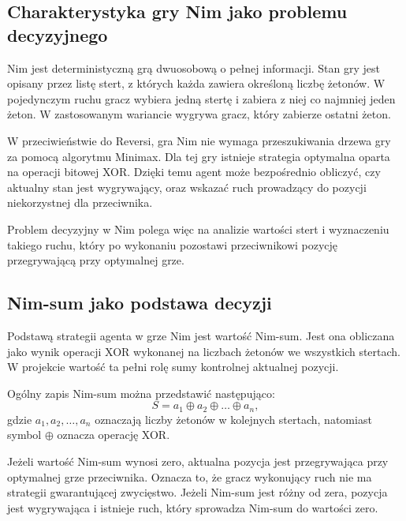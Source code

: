 \subsection{Charakterystyka gry Nim jako problemu decyzyjnego}

Nim jest deterministyczną grą dwuosobową o pełnej informacji. Stan gry jest opisany przez listę stert, z których każda zawiera określoną liczbę żetonów. W pojedynczym ruchu gracz wybiera jedną stertę i zabiera z niej co najmniej jeden żeton. W zastosowanym wariancie wygrywa gracz, który zabierze ostatni żeton.

W przeciwieństwie do Reversi, gra Nim nie wymaga przeszukiwania drzewa gry za pomocą algorytmu Minimax. Dla tej gry istnieje strategia optymalna oparta na operacji bitowej XOR. Dzięki temu agent może bezpośrednio obliczyć, czy aktualny stan jest wygrywający, oraz wskazać ruch prowadzący do pozycji niekorzystnej dla przeciwnika.

Problem decyzyjny w Nim polega więc na analizie wartości stert i wyznaczeniu takiego ruchu, który po wykonaniu pozostawi przeciwnikowi pozycję przegrywającą przy optymalnej grze.

\newpage

\subsection{Nim-sum jako podstawa decyzji}

Podstawą strategii agenta w grze Nim jest wartość Nim-sum. Jest ona obliczana jako wynik operacji XOR wykonanej na liczbach żetonów we wszystkich stertach. W projekcie wartość ta pełni rolę sumy kontrolnej aktualnej pozycji.

Ogólny zapis Nim-sum można przedstawić następująco:
\begin{equation*}
S = a_1 \oplus a_2 \oplus \ldots \oplus a_n,
\end{equation*}
gdzie $a_1, a_2, \ldots, a_n$ oznaczają liczby żetonów w kolejnych stertach, natomiast symbol $\oplus$ oznacza operację XOR.

Jeżeli wartość Nim-sum wynosi zero, aktualna pozycja jest przegrywająca przy optymalnej grze przeciwnika. Oznacza to, że gracz wykonujący ruch nie ma strategii gwarantującej zwycięstwo. Jeżeli Nim-sum jest różny od zera, pozycja jest wygrywająca i istnieje ruch, który sprowadza Nim-sum do wartości zero.



